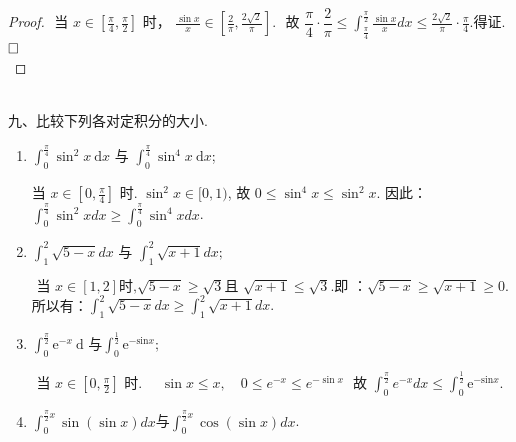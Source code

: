 \documentclass[lang=cn,newtx,10pt,scheme=chinese]{elegantbook}
\begin{document}
\begin{proof}
$\text { 当 } x \displaystyle\in\left[\frac{\pi}{4}, \frac{\pi}{2}\right] \text { 时， } \frac{\sin x}{x} \in\left[\frac{2}{\pi}, \frac{2 \sqrt{2}}{\pi}\right] $.\quad
$\text { 故 } \dfrac{\pi}{4} \cdot \dfrac{2}{\pi} \leq \displaystyle\int_{\frac{\pi}{4}}^{\frac{\pi}{2}} \frac{\sin x}{x} d x \leq \frac{2 \sqrt{2}}{\pi} \cdot \frac{\pi}{4}.$得证.$\hfill\square$
~\\
\end{proof}


~\\
九、比较下列各对定积分的大小.\\
\begin{enumerate}
	\item $\displaystyle\int_0^{\frac{\pi}{4}} \sin ^2 x \mathrm{~d} x$ 与 $\displaystyle\int_0^{\frac{\pi}{4}} \sin ^4 x \mathrm{~d} x$;
	\begin{solution}
	当 $x\displaystyle\in\left[0, \frac{\pi}{4}\right]$ 时. $\sin ^2 x \in[0,1)$, 故 $0 \leqslant \sin ^4 x \leqslant \sin ^2 x$.\quad 
	因此：$\displaystyle\int_0^{\frac{\pi}{4}} \sin ^2 x d x \geqslant \int_0^{\frac{\pi}{4}} \sin ^4 x d x$.\\
	\end{solution}

\item $ \displaystyle\int_1^2 \sqrt{5-x} d x \text { 与 } \int_1^2 \sqrt{x+1} d x ;$ 
\begin{solution}
	$\text { 当 } x \displaystyle\in[1,2] \text {时,} \sqrt{5-x} \geqslant \sqrt{3} \text {且 } \sqrt{x+1} \leqslant \sqrt{3} \text {.即 ：} \sqrt{5-x} \geqslant \sqrt{x+1} \geqslant 0 .$ 
	所以有：$\displaystyle \int_1^2 \sqrt{5-x} d x \geqslant \int_1^2 \sqrt{x+1} d x.$
\end{solution}
\item $ \displaystyle\int_0^{\frac{\pi}{2}} \mathrm{e}^{-x} \mathrm{~d} \text { 与} \int_0^{\frac{1}{2}} \mathrm{e}^{-\mathrm{sin} x} \text {; }$ 
\begin{solution}
	$ \text { 当 } x \displaystyle\in\left[0, \frac{\pi}{2}\right] \text { 时. } \quad \sin x \leq x, \quad 0 \leq e^{-x} \leq e^{-\sin x}$\quad
	$\text { 故 }\displaystyle \int_0^{\frac{\pi}{2}} e^{-x} d x \leqslant \int_0^{\frac{1}{2}} \mathrm{e}^{-\mathrm{sin} x}.$
\end{solution}

\item $\displaystyle\int_{0}^{\frac{\pi}{2}x}\sin(\sin x) dx$与$\displaystyle\int_{0}^{\frac{\pi}{2}x}\cos(\sin x) dx$.


\end{enumerate}
\end{document}
